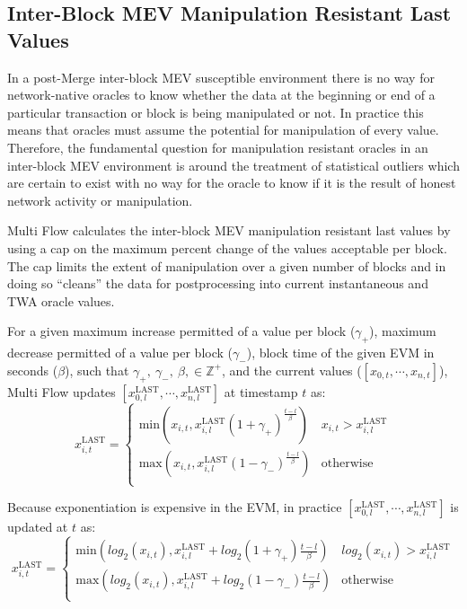 \documentclass[tikz]{article}
\begin{document}
\subsection{Inter-Block MEV Manipulation Resistant Last Values}
In a post-Merge inter-block MEV susceptible environment there is no way for network-native oracles to know whether the data at the beginning or end of a particular transaction or block is being manipulated or not. In practice this means that oracles must assume the potential for manipulation of every value. Therefore, the fundamental question for manipulation resistant oracles in an inter-block MEV environment is around the treatment of statistical outliers which are certain to exist with no way for the oracle to know if it is the result of honest network activity or manipulation. 

Multi Flow calculates the inter-block MEV manipulation resistant last values by using a cap on the maximum percent change of the values acceptable per block. The cap limits the extent of manipulation over a given number of blocks and in doing so “cleans” the data for postprocessing into current instantaneous and TWA oracle values. 

For a given maximum increase permitted of a value per block ($\gamma_+$), maximum decrease permitted of a value per block ($\gamma_-$), block time of the given EVM in seconds ($\beta$), such that $\gamma_+,\ \gamma_-,\ \beta, \in \mathbb{Z}^{+}$, and the current values ($[x_{0,t}, \cdots, x_{n,t}]$), Multi Flow updates $[x^{\text{LAST}}_{0,l}, \cdots, x^{\text{LAST}}_{n,l}]$ at timestamp $t$ as:
$$
x^{\text{LAST}}_{i,t} = 
\begin{cases}
\text{min}\left(x_{i,t}, x^{\text{LAST}}_{i,l}(1+\gamma_+)^\frac{t-l}{\beta}\right) & x_{i,t} > x^{\text{LAST}}_{i,l} \\
\text{max}\left(x_{i,t}, x^{\text{LAST}}_{i,l}(1-\gamma_-)^\frac{t-l}{\beta}\right) & \text{otherwise} \\
\end{cases}
$$

Because exponentiation is expensive in the EVM, in practice $[x^{\text{LAST}}_{0,l}, \cdots, x^{\text{LAST}}_{n,l}]$ is updated at $t$ as:
$$
x^{\text{LAST}}_{i,t} = 
\begin{cases}
\text{min}\left(log_2(x_{i,t}), x^{\text{LAST}}_{i,l} + log_2(1+\gamma_+) \frac{t-l}{\beta}\right) & log_2(x_{i,t}) > x^{\text{LAST}}_{i,l} \\
\text{max}\left(log_2(x_{i,t}), x^{\text{LAST}}_{i,l} + log_2(1-\gamma_-) \frac{t-l}{\beta}\right) & \text{otherwise} \\
\end{cases}
$$
\end{document}
